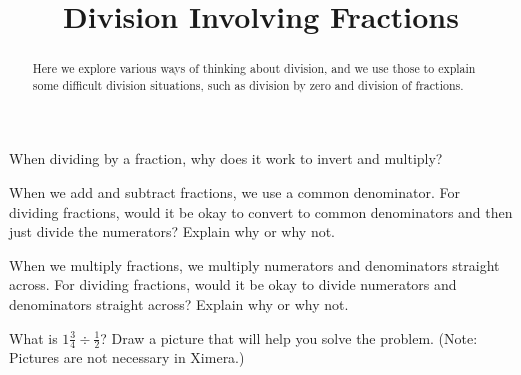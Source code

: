 \documentclass{ximera}
\title{Division Involving Fractions}
\begin{document}
\begin{abstract}
Here we explore various ways of thinking about division, and we use those to explain some difficult division situations, such as division by zero and division of fractions.
\end{abstract}
\maketitle


\begin{problem}
When dividing by a fraction, why does it work to invert and multiply?
\begin{freeResponse}
\end{freeResponse}
\end{problem}

\begin{problem}
When we add and subtract fractions, we use a common denominator.  For dividing fractions, would it be okay to convert to common denominators and then just divide the numerators?  Explain why or why not. 
\begin{freeResponse}
\end{freeResponse}
\end{problem}


\begin{problem}
When we multiply fractions, we multiply numerators and denominators straight across.  For dividing fractions, would it be okay to divide numerators and denominators straight across?  Explain why or why not. 
\begin{freeResponse}
\end{freeResponse}
\end{problem}

\begin{problem}
What is $1 \frac{3}{4} \div \frac{1}{2}$?  Draw a picture that will help you solve the problem.  (Note: Pictures are not necessary in Ximera.)
\begin{freeResponse}
\end{freeResponse}
\end{problem}
\end{document}
